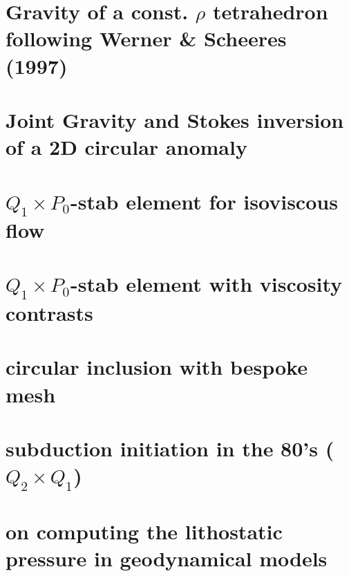 \documentclass[a4paper,11pt]{report}
\begin{document}
\chapter{Gravity of a const. $\rho$ tetrahedron following Werner \& Scheeres (1997) \label{f113}} %

\chapter{Joint Gravity and Stokes inversion of a 2D circular anomaly \label{f114}} %

\chapter{$Q_1\times P_0$-stab element for isoviscous flow \label{f115}} %

\chapter{$Q_1\times P_0$-stab element with viscosity contrasts\label{f116}} %

\chapter{circular inclusion with bespoke mesh \label{f117}} %

\chapter{subduction initiation in the 80's ($Q_2\times Q_1$) \label{f118}} %

\chapter{on computing the lithostatic pressure in geodynamical models \label{f119}} %
\end{document}
